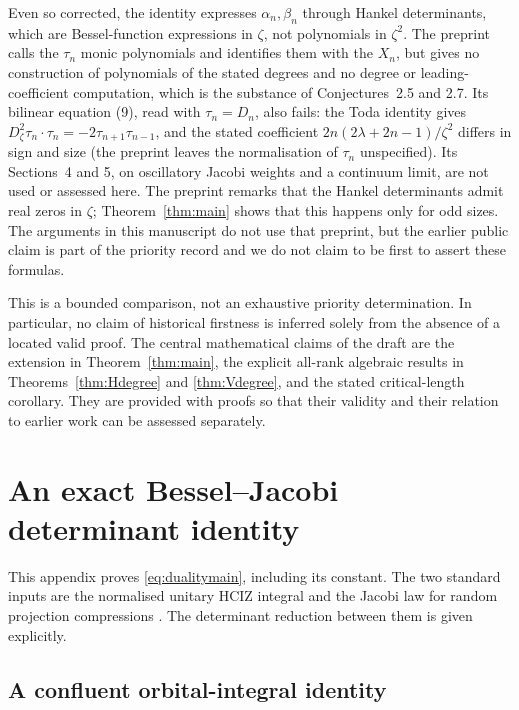 \documentclass[11pt]{article}
\numberwithin{equation}{section}
\theoremstyle{remark}
\begin{document}
Even so corrected, the identity expresses $\alpha_n,\beta_n$ through
Hankel determinants, which are Bessel-function expressions in $\zeta$,
not polynomials in $\zeta^2$. The preprint calls the $\tau_n$ monic
polynomials and identifies them with the $X_n$, but gives no construction
of polynomials of the stated degrees and no degree or leading-coefficient
computation, which is the substance of Conjectures~2.5 and 2.7. Its
bilinear equation (9), read with $\tau_n=D_n$, also fails: the Toda
identity gives $D_\zeta^2\tau_n\cdot\tau_n=-2\tau_{n+1}\tau_{n-1}$, and the
stated coefficient $2n(2\lambda+2n-1)/\zeta^2$ differs in sign and size
(the preprint leaves the normalisation of $\tau_n$ unspecified). Its
Sections~4 and 5, on oscillatory Jacobi weights and a continuum limit, are
not used or assessed here. The preprint remarks that the Hankel
determinants admit real zeros in $\zeta$; Theorem~\ref{thm:main} shows that
this happens only for odd sizes. The arguments in this manuscript do not
use that preprint, but the earlier public claim is part of the priority
record and we do not claim to be first to assert these formulas.

This is a bounded comparison, not an exhaustive priority determination.
In particular, no claim of historical firstness is inferred solely
from the absence of a located valid proof. The central mathematical
claims of the draft are the extension in Theorem~\ref{thm:main}, the
explicit all-rank algebraic results in
Theorems~\ref{thm:Hdegree} and \ref{thm:Vdegree}, and the stated
critical-length corollary. They are provided with proofs so that their
validity and their relation to earlier work can be assessed separately.

\appendix
\section{An exact Bessel--Jacobi determinant identity}\label{app:duality}

This appendix proves \eqref{eq:dualitymain}, including its constant.
The two standard inputs are the normalised unitary HCIZ integral
\cite[Eq.~(2)]{McSwiggen2019} and the Jacobi law for random projection
compressions \cite[Theorem~2.2]{Collins2005}. The determinant reduction
between them is given explicitly.

\subsection{A confluent orbital-integral identity}
\end{document}
